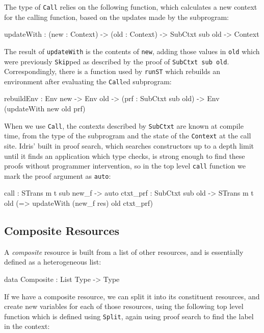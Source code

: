 The type of \texttt{Call} relies on the following function, which
calculates a new context for the calling function, based on the updates
made by the subprogram:

\small
\begin{code}
updateWith : (new : Context) -> (old : Context) -> SubCtxt sub old -> Context
\end{code}
\normalsize

The result of \texttt{updateWith} is the contents of \texttt{new}, adding
those values in \texttt{old} which were previously \texttt{Skip}ped as
described by the proof of \texttt{SubCtxt sub old}.
Correspondingly, there is a function used by \texttt{runST} which rebuilds
an environment after evaluating the \texttt{Call}ed subprogram:

\small
\begin{code}
rebuildEnv : Env new -> Env old -> (prf : SubCtxt sub old) ->
             Env (updateWith new old prf)
\end{code}
\normalsize

When we use \texttt{Call}, the contexts described by 
\texttt{SubCtxt} are known at compile time, from the type of the subprogram
and the state of the \texttt{Context} at the call site. Idris'
built in proof search, which searches constructors up to a 
depth limit until it finds an application which type checks, is strong enough
to find these proofs without programmer intervention, so in the top level
\texttt{call} function we mark the proof argument as \texttt{auto}:

\small
\begin{code}
call : STrans m t sub new_f -> {auto ctxt_prf : SubCtxt sub old} ->
       STrans m t old (\res => updateWith (new_f res) old ctxt_prf)
\end{code}
\normalsize

\subsection{Composite Resources}

\label{sect:splitcomb}

A \emph{composite} resource is built from a list of other resources, and
is essentially defined as a heterogeneous list:

\small
\begin{code}
data Composite : List Type -> Type
\end{code}
\normalsize

If we have a composite resource, we can split it into its
constituent resources, and create new variables for each of those resources,
using the following top level function which is defined using \texttt{Split},
again using proof search to find the label in the context:

